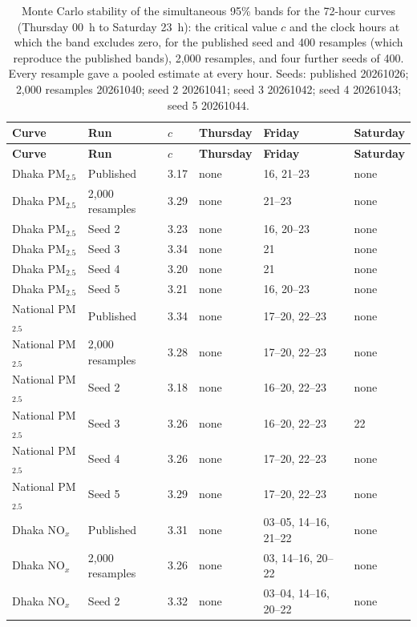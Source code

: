 \begingroup\scriptsize
\begin{longtable}{L{2.6cm} L{2.4cm} C{0.9cm} L{2.0cm} L{3.6cm} L{2.0cm}}
\caption{Monte Carlo stability of the simultaneous 95\% bands for the 72-hour curves (Thursday 00~h to Saturday 23~h): the critical value $c$ and the clock hours at which the band excludes zero, for the published seed and 400 resamples (which reproduce the published bands), 2,000 resamples, and four further seeds of 400. Every resample gave a pooled estimate at every hour. Seeds: published 20261026; 2,000 resamples 20261040; seed 2 20261041; seed 3 20261042; seed 4 20261043; seed 5 20261044.}\label{tab:s-stability-hourly}\\
\toprule
\textbf{Curve} & \textbf{Run} & \textbf{$c$} & \textbf{Thursday} & \textbf{Friday} & \textbf{Saturday} \\
\midrule\endfirsthead
\toprule
\textbf{Curve} & \textbf{Run} & \textbf{$c$} & \textbf{Thursday} & \textbf{Friday} & \textbf{Saturday} \\
\midrule\endhead
\bottomrule\endfoot
Dhaka PM$_{2.5}$ & Published & 3.17 & none & 16, 21--23 & none \\
Dhaka PM$_{2.5}$ & 2,000 resamples & 3.29 & none & 21--23 & none \\
Dhaka PM$_{2.5}$ & Seed 2 & 3.23 & none & 16, 20--23 & none \\
Dhaka PM$_{2.5}$ & Seed 3 & 3.34 & none & 21 & none \\
Dhaka PM$_{2.5}$ & Seed 4 & 3.20 & none & 21 & none \\
Dhaka PM$_{2.5}$ & Seed 5 & 3.21 & none & 16, 20--23 & none \\
National PM$_{2.5}$ & Published & 3.34 & none & 17--20, 22--23 & none \\
National PM$_{2.5}$ & 2,000 resamples & 3.28 & none & 17--20, 22--23 & none \\
National PM$_{2.5}$ & Seed 2 & 3.18 & none & 16--20, 22--23 & none \\
National PM$_{2.5}$ & Seed 3 & 3.26 & none & 16--20, 22--23 & 22 \\
National PM$_{2.5}$ & Seed 4 & 3.26 & none & 17--20, 22--23 & none \\
National PM$_{2.5}$ & Seed 5 & 3.29 & none & 17--20, 22--23 & none \\
Dhaka NO$_x$ & Published & 3.31 & none & 03--05, 14--16, 21--22 & none \\
Dhaka NO$_x$ & 2,000 resamples & 3.26 & none & 03, 14--16, 20--22 & none \\
Dhaka NO$_x$ & Seed 2 & 3.32 & none & 03--04, 14--16, 20--22 & none \\

\end{longtable}
